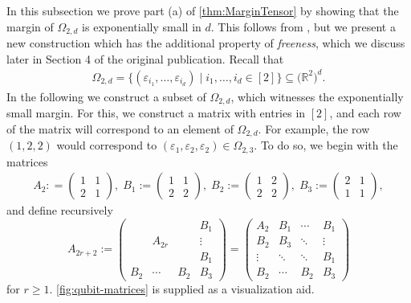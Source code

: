 \documentclass[10pt,a4paper]{article}
\numberwithin{equation}{section}
\newcommand{\RR}{\mathbb R}
\newcommand{\eps}{\varepsilon}
\begin{document}
In this subsection we prove part (a) of \cref{thm:MarginTensor} by showing that the margin of $\Omega_{2,d}$ is exponentially small in $d$. This follows from \cite{alon1997anti}, but we present a new construction which has the additional property of \emph{freeness}, which we discuss later in Section 4 of the original publication. Recall that 
	\begin{align*}
	\Omega_{2,d} =  \big\lbrace (\eps_{i_1}, \ldots, \eps_{i_d}) \mid i_1, \ldots, i_d \in [2] \big\rbrace \subseteq \big( \RR^2 \big)^d.
	\end{align*}
In the following we construct a subset of $\Omega_{2,d}$, which witnesses the exponentially small margin. For this, we construct a matrix with entries in $[2]$, and each row of the matrix will correspond to an element of $\Omega_{2,d}$. For example, the row $(1,2,2)$ would correspond to $(\eps_1, \eps_2, \eps_2) \in \Omega_{2,3}$. To do so, we begin with the matrices 
	\begin{align*}
	A_2 : = \begin{pmatrix} 1 & 1 \\ 2 & 1 \end{pmatrix} , \;
	B_1 := \begin{pmatrix} 1 & 1 \\ 2 & 2 \end{pmatrix} , \;
	B_2 := \begin{pmatrix} 1 & 2 \\ 2 & 2 \end{pmatrix} , \;
	B_3 := \begin{pmatrix} 2 & 1 \\ 1 & 1 \end{pmatrix} ,
	\end{align*}
and define recursively
	\begin{equation}\label{eq:defA2r}
	A_{2r+2} := \begin{pmatrix}
	  &  &  & B_1 \\ 
	  &  A_{2r} &  & \vdots \\ 
	  &  &  & B_1 \\ 
	B_2 & \cdots & B_2 & B_3
	\end{pmatrix} = 
	\begin{pmatrix}
	 A_2 & B_1 & \cdots & B_1 \\ 
	 B_2  & B_3 & \ddots & \vdots \\ 
	 \vdots & \ddots & \ddots& B_1 \\ 
	 B_2 & \cdots & B_2 & B_3
	\end{pmatrix}
	\end{equation}
for $r \geq 1$. \cref{fig:qubit-matrices} is supplied as a visualization aid.
\end{document}
